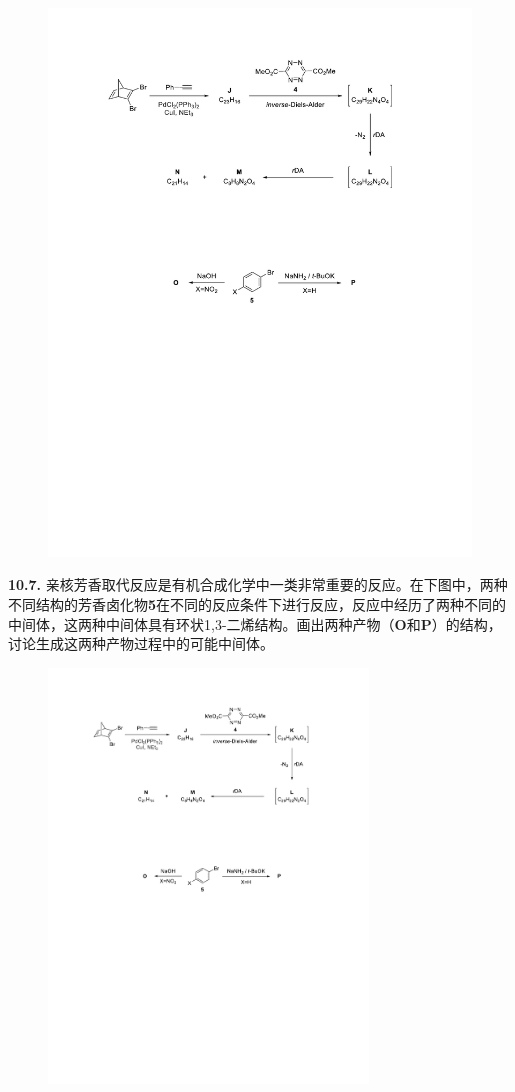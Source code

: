 \begin{figure}[h!]
	\centering
	\includegraphics[width=13.5cm]{./pic/t10-7.pdf}
\end{figure}

\noindent\textbf{10.7.}
亲核芳香取代反应是有机合成化学中一类非常重要的反应。在下图中，两种不同结构的芳香卤化物\textbf{5}在不同的反应条件下进行反应，反应中经历了两种不同的中间体，这两种中间体具有环状1,3-二烯结构。画出两种产物（\textbf{O}和\textbf{P}）的结构，讨论生成这两种产物过程中的可能中间体。

\begin{figure}[h!]
	\centering
	\includegraphics[width=8.5cm]{./pic/t10-8.pdf}
\end{figure}